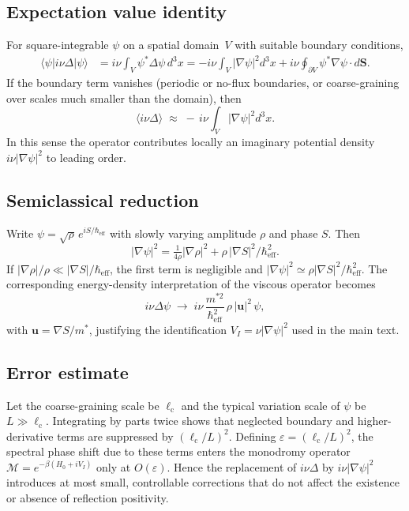 \documentclass[11pt]{article}
\begin{document}
\subsection*{Expectation value identity}
For square-integrable $\psi$ on a spatial domain~$V$ with suitable boundary conditions,
\begin{align}
    \langle \psi | i\nu\Delta | \psi\rangle 
    &= i\nu \!\int_V \psi^* \Delta \psi \, d^3x 
       = -i\nu \!\int_V |\nabla\psi|^2 d^3x
       + i\nu \!\oint_{\partial V} \psi^* \nabla\psi\!\cdot\! d\mathbf S .
\end{align}
If the boundary term vanishes (periodic or no-flux boundaries, or coarse-graining over scales much smaller than the domain), then
\begin{equation}
    \langle i\nu\Delta \rangle \;\approx\; -\,i\nu \!\int_V |\nabla\psi|^2 d^3x .
\end{equation}
In this sense the operator contributes locally an imaginary potential density $i\nu|\nabla\psi|^2$ to leading order.

\subsection*{Semiclassical reduction}
Write $\psi=\sqrt{\rho}\,e^{iS/\hbar_{\mathrm{eff}}}$ with slowly varying amplitude $\rho$ and phase $S$.  
Then
\[
|\nabla\psi|^2
= \tfrac{1}{4\rho}|\nabla\rho|^2
+ \rho\,|\nabla S|^2/\hbar_{\mathrm{eff}}^2 .
\]
If $|\nabla\rho|/\rho\ll|\nabla S|/\hbar_{\mathrm{eff}}$, the first term is negligible and
$|\nabla\psi|^2\simeq \rho|\nabla S|^2/\hbar_{\mathrm{eff}}^2$.
The corresponding energy-density interpretation of the viscous operator becomes
\begin{equation}
    i\nu\Delta\psi \;\longrightarrow\; i\nu\,\frac{m^{*2}}{\hbar_{\mathrm{eff}}^2}\,\rho\,|\mathbf u|^2\,\psi ,
\end{equation}
with $\mathbf u=\nabla S/m^*$, justifying the identification $V_I=\nu|\nabla\psi|^2$ used in the main text.

\subsection*{Error estimate}
Let the coarse-graining scale be $\ell_{\mathrm{c}}$ and the typical variation scale of $\psi$ be $L\gg\ell_{\mathrm{c}}$.  
Integrating by parts twice shows that neglected boundary and higher-derivative terms are suppressed by $(\ell_{\mathrm{c}}/L)^2$.  
Defining $\varepsilon=(\ell_{\mathrm{c}}/L)^2$, the spectral phase shift due to these terms enters the monodromy operator $\mathcal M=e^{-\beta(H_0+iV_I)}$ only at $O(\varepsilon)$.  
Hence the replacement of $i\nu\Delta$ by $i\nu|\nabla\psi|^2$ introduces at most small, controllable corrections that do not affect the existence or absence of reflection positivity.
\end{document}

